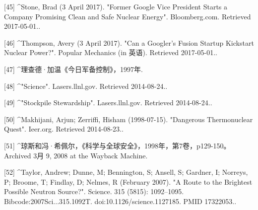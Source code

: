 [45]
^Stone, Brad (3 April 2017). "Former Google Vice President Starts a Company Promising Clean and Safe Nuclear Energy". Bloomberg.com. Retrieved 2017-05-01..

[46]
^Thompson, Avery (3 April 2017). "Can a Googler's Fusion Startup Kickstart Nuclear Power?". Popular Mechanics (in 英语). Retrieved 2017-05-01..

[47]
^理查德·加温《今日军备控制》，1997年.

[48]
^"Science". Lasers.llnl.gov. Retrieved 2014-08-24..

[49]
^"Stockpile Stewardship". Lasers.llnl.gov. Retrieved 2014-08-24..

[50]
^Makhijani, Arjun; Zerriffi, Hisham (1998-07-15). "Dangerous Thermonuclear Quest". Ieer.org. Retrieved 2014-08-23..

[51]
^琼斯和冯·希佩尔，《科学与全球安全》，1998年，第7卷，p129-150。 Archived 3月 9, 2008 at the Wayback Machine.

[52]
^Taylor, Andrew; Dunne, M; Bennington, S; Ansell, S; Gardner, I; Norreys, P; Broome, T; Findlay, D; Nelmes, R (February 2007). "A Route to the Brightest Possible Neutron Source?". Science. 315 (5815): 1092–1095. Bibcode:2007Sci...315.1092T. doi:10.1126/science.1127185. PMID 17322053..